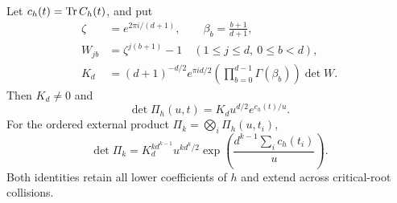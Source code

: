 \begin{theorem}
Let $c_h(t)=\operatorname{Tr} C_h(t)$, and put
\begin{align}
 \zeta&=e^{2\pi i/(d+1)},\qquad \beta_b=\frac{b+1}{d+1},
       \nonumber\\
 W_{jb}&=\zeta^{j(b+1)}-1
       \quad(1\le j\le d,\ 0\le b<d),\nonumber\\
 K_d&=(d+1)^{-d/2}e^{\pi i d/2}
           \left(\prod_{b=0}^{d-1}\Gamma(\beta_b)\right)\det W.
       \label{eq:constant}
\end{align}
Then $K_d\ne0$ and
\begin{equation}
 \boxed{\det\Pi_h(u,t)=K_d u^{d/2}e^{c_h(t)/u}.}
 \label{eq:det-one}
\end{equation}
For the ordered external product $\Pi_k=\bigotimes_i\Pi_h(u,t_i)$,
\begin{equation}
 \boxed{\det\Pi_k
   =K_d^{k d^{k-1}}u^{k d^k/2}
         \exp\!\left(\frac{d^{k-1}\sum_i c_h(t_i)}u\right).}
 \label{eq:det-all}
\end{equation}
Both identities retain all lower coefficients of $h$ and extend across
critical-root collisions.
\end{theorem}
